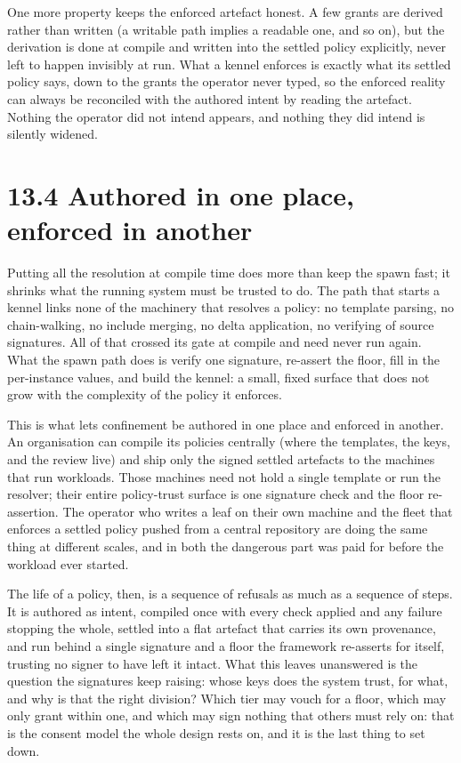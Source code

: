 One more property keeps the enforced artefact honest. A few grants are
derived rather than written (a writable path implies a readable one, and
so on), but the derivation is done at compile and written into the
settled policy explicitly, never left to happen invisibly at run. What a
kennel enforces is exactly what its settled policy says, down to the
grants the operator never typed, so the enforced reality can always be
reconciled with the authored intent by reading the artefact. Nothing the
operator did not intend appears, and nothing they did intend is silently
widened.

\hypertarget{authored-in-one-place-enforced-in-another}{%
\section{13.4 Authored in one place, enforced in
another}\label{authored-in-one-place-enforced-in-another}}

Putting all the resolution at compile time does more than keep the spawn
fast; it shrinks what the running system must be trusted to do. The path
that starts a kennel links none of the machinery that resolves a policy:
no template parsing, no chain-walking, no include merging, no delta
application, no verifying of source signatures. All of that crossed its
gate at compile and need never run again. What the spawn path does is
verify one signature, re-assert the floor, fill in the per-instance
values, and build the kennel: a small, fixed surface that does not grow
with the complexity of the policy it enforces.

This is what lets confinement be authored in one place and enforced in
another. An organisation can compile its policies centrally (where the
templates, the keys, and the review live) and ship only the signed
settled artefacts to the machines that run workloads. Those machines
need not hold a single template or run the resolver; their entire
policy-trust surface is one signature check and the floor re-assertion.
The operator who writes a leaf on their own machine and the fleet that
enforces a settled policy pushed from a central repository are doing the
same thing at different scales, and in both the dangerous part was paid
for before the workload ever started.

The life of a policy, then, is a sequence of refusals as much as a
sequence of steps. It is authored as intent, compiled once with every
check applied and any failure stopping the whole, settled into a flat
artefact that carries its own provenance, and run behind a single
signature and a floor the framework re-asserts for itself, trusting no
signer to have left it intact. What this leaves unanswered is the
question the signatures keep raising: whose keys does the system trust,
for what, and why is that the right division? Which tier may vouch for a
floor, which may only grant within one, and which may sign nothing that
others must rely on: that is the consent model the whole design rests
on, and it is the last thing to set down.
